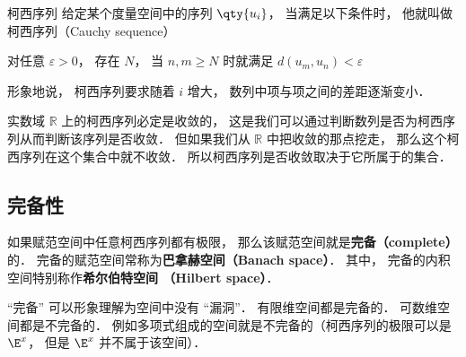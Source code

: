 

\begin{definition}{柯西序列}
给定某个度量空间中的序列 $\qty{u_i}$， 当满足以下条件时， 他就叫做柯西序列（Cauchy sequence）

对任意 $\varepsilon > 0$， 存在 $N$， 当 $n, m \geqslant N$ 时就满足 $d(u_m, u_n) < \varepsilon$
\end{definition}

形象地说， 柯西序列要求随着 $i$ 增大， 数列中项与项之间的差距逐渐变小．

实数域 $\mathbb R$ 上的柯西序列必定是收敛的， 这是我们可以通过判断数列是否为柯西序列从而判断该序列是否收敛． 但如果我们从 $\mathbb R$ 中把收敛的那点挖走， 那么这个柯西序列在这个集合中就不收敛． 所以柯西序列是否收敛取决于它所属于的集合． %

\subsection{完备性}
如果赋范空间中任意柯西序列都有极限， 那么该赋范空间就是\textbf{完备（complete）}的． 完备的赋范空间常称为\textbf{巴拿赫空间（Banach space）}． 其中， 完备的内积空间特别称作\textbf{希尔伯特空间 （Hilbert space）}．

“完备” 可以形象理解为空间中没有 “漏洞”． 有限维空间都是完备的． 可数维空间都是不完备的． 例如多项式组成的空间就是不完备的（柯西序列的极限可以是 $\E^x$， 但是 $\E^x$ 并不属于该空间）．
